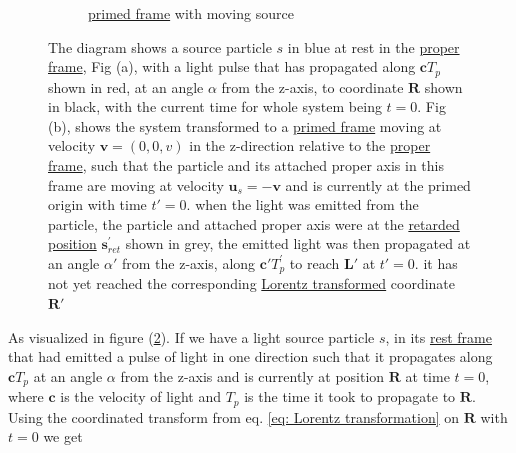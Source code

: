 \begin{figure}[H]
\begin{subfigure}{.49\textwidth}
		\caption{\hyperlink{def-Primed-Frame}{primed frame} with moving source}
		\label{fig: primed frame 1}
	\end{subfigure}
	\caption{The diagram shows a source particle $s$ in blue at rest in the \protect\hyperlink{def-proper-frame}{proper frame}, Fig (a), with a light pulse that has propagated along $\mathbf{c} {T}_{p}$ shown in red, at an angle $\alpha$ from the z-axis, to coordinate $\mathbf{R}$ shown in black, with the current time for whole system being $t=0$.
	Fig (b), shows the system transformed to a \protect\hyperlink{def-Primed-Frame}{primed frame} moving at velocity $\mathbf{v}=(0,0,v)$ in the z-direction relative to the \protect\hyperlink{def-proper-frame}{proper frame}, such that the particle and its attached proper axis in this frame are moving at velocity $\mathbf{u}_s= - \mathbf{v}$ and is currently at the primed origin with time $t{'}=0$. when the light was emitted from the particle, the particle and attached proper axis were at the \protect\hyperlink{def-retarded-position}{retarded position} $\mathbf{s}_{ret}^{'}$ shown in grey, the emitted light was then propagated at an angle $\alpha{'}$ from the z-axis, along $\mathbf{c}{'} {T}_{p}^{'}$ to reach $\mathbf{L}{'}$ at $t{'}=0$. it has not yet reached the corresponding \protect\hyperlink{def-lorentz-transform}{Lorentz transformed} coordinate $\mathbf{R}{'}$ }
	\label{fig: Retarded field outward field transform}
\end{figure}

As visualized in figure (\ref{fig: Retarded field outward field transform}). If we have a light source particle $s$, in its \hyperlink{def-proper-frame}{rest frame} that had emitted a pulse of light in one direction such that it propagates along $\mathbf{c} {T}_{p}$ at an angle $\alpha$ from the z-axis and is currently at position $\mathbf{R}$ at time $t=0$, where $\mathbf{c}$ is the velocity of light and ${T}_{p}$ is the time it took to propagate to $\mathbf{R}$.
Using the coordinated transform from eq. \eqref{eq: Lorentz transformation} on $\mathbf{R}$ with $t=0$ we get

